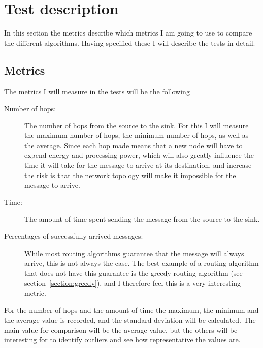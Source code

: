 \section{Test description}
\label{section:test_description}

In this section the metrics  describe which metrics I am going to use to compare the different algorithms. Having specified these I will describe the tests in detail.

\subsection{Metrics}

The metrics I will measure in the tests will be the following
\begin{description}
\item[Number of hops:] The number of hops from the source to the sink. For this I will measure the maximum number of hops, the minimum number of hops, as well as the average. Since each hop made means that a new node will have to expend energy and processing power, which will also greatly influence the time it will take for the message to arrive at its destination, and increase the risk is that the network topology will make it impossible for the message to arrive.

\item[Time:] The amount of time spent sending the message from the source to the sink. 

\item[Percentages of successfully arrived messages:] While most routing algorithms guarantee that the message will always arrive, this is not always the case. The best example of a routing algorithm that does not have this guarantee is the greedy routing algorithm (see section~\ref{section:greedy}), and I therefore feel this is a very interesting metric.
\end{description}

For the number of hops and the amount of time the maximum, the minimum and the average value is recorded, and the standard deviation will be calculated. The main value for comparison will be the average value, but the others will be interesting for to identify outliers and see how representative the values are.

